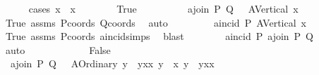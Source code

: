 \begin{isabellebody}
\ \ \ \ \isamarkupfalse%
\ {\isacharparenleft}{\kern0pt}cases\ {\isachardoublequoteopen}{\isacharparenleft}{\kern0pt}x{}\ {\isacharequal}{\kern0pt}\ x{}{\isacharparenright}{\kern0pt}{\isachardoublequoteclose}{\isacharparenright}{\kern0pt}\isanewline
\ \ \ \ \ \ \isamarkupfalse%
\ True\ \isanewline
\ \ \ \ \ \ \isamarkupfalse%
\ {}{\isacharcolon}{\kern0pt}\ {\isachardoublequoteopen}a{}join\ P\ Q\ {\isacharequal}{\kern0pt}\ \ A{}Vertical\ x{}{\isachardoublequoteclose}\ \isamarkupfalse%
\ True\ assms\ Pcoords\ Qcoords\ \isamarkupfalse%
\ auto\isanewline
\ \ \ \ \ \ \isamarkupfalse%
\ {}{\isacharcolon}{\kern0pt}\ {\isachardoublequoteopen}a{}incid\ P\ {\isacharparenleft}{\kern0pt}A{}Vertical\ x{}{\isacharparenright}{\kern0pt}{\isachardoublequoteclose}\ \isamarkupfalse%
\ True\ assms\ Pcoords\ a{}incid{\isachardot}{\kern0pt}simps\ \isamarkupfalse%
\ blast\isanewline
\ \ \ \ \ \ \isamarkupfalse%
\ {\isachardoublequoteopen}a{}incid\ P\ {\isacharparenleft}{\kern0pt}a{}join\ P\ Q{\isacharparenright}{\kern0pt}{\isachardoublequoteclose}\ \isamarkupfalse%
\ {}\ {}\ \isamarkupfalse%
\ auto\isanewline
\ \ \ \ \isamarkupfalse%
\isanewline
\ \ \ \ \ \ \isamarkupfalse%
\ False\isanewline
\ \ \ \ \ \ \isamarkupfalse%
\ {}{\isacharcolon}{\kern0pt}\ {\isachardoublequoteopen}a{}join\ P\ Q\ {\isacharequal}{\kern0pt}\ \ {\isacharparenleft}{\kern0pt}A{}Ordinary\ {\isacharparenleft}{\kern0pt}{\isacharparenleft}{\kern0pt}y{}\ {\isacharminus}{\kern0pt}\ y{}{\isacharparenright}{\kern0pt}{\isacharslash}{\kern0pt}{\isacharparenleft}{\kern0pt}x{}{\isacharminus}{\kern0pt}x{}{\isacharparenright}{\kern0pt}{\isacharparenright}{\kern0pt}\ {\isacharparenleft}{\kern0pt}y{}\ {\isacharminus}{\kern0pt}\ x{}{\isacharasterisk}{\kern0pt}\ {\isacharparenleft}{\kern0pt}y{}\ {\isacharminus}{\kern0pt}\ y{}{\isacharparenright}{\kern0pt}{\isacharslash}{\kern0pt}{\isacharparenleft}{\kern0pt}x{}{\isacharminus}{\kern0pt}x{}{\isacharparenright}{\kern0pt}{\isacharparenright}{\kern0pt}{\isacharparenright}{\kern0pt}{\isachardoublequoteclose}\ \isamarkupfalse%

\end{isabellebody}
